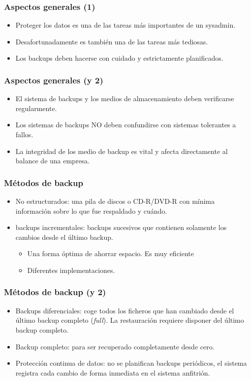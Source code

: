 \documentclass{beamer}
\begin{document}
\begin{frame}
  \frametitle{Aspectos generales (1)}
  \begin{itemize}
    \item Proteger los datos es una de las tareas más importantes de un sysadmin.
    \item Desafortunadamente es también una de las tareas más tediosas.

    \item Los backups deben hacerse con cuidado y estrictamente planificados.
  \end{itemize}
\end{frame}

\begin{frame}
  \frametitle{Aspectos generales (y 2)}
  \begin{itemize}
    \item El sistema de backups y los medios de almacenamiento deben verificarse regularmente.
    \item Los sistemas de backups NO deben confundirse con sistemas tolerantes a fallos.
    \item La integridad de los medio de backup es vital y afecta directamente al balance de una empresa. 
  \end{itemize}
\end{frame}


\begin{frame}
  \frametitle{Métodos de backup}
  \begin{itemize}
    \item \alert{No estructurados:} una pila de discos o CD-R/DVD-R con mínima información sobre lo que fue respaldado y cuándo. 
    \item \alert{backups incrementales:} backups sucesivos que contienen solamente los cambios desde el último backup.
	  \begin{itemize}
		\item Una forma óptima de ahorrar espacio. Es muy eficiente
		\item Diferentes implementaciones.
	  \end{itemize}
  \end{itemize}
\end{frame}

\begin{frame}
  \frametitle{Métodos de backup (y 2)}
  \begin{itemize}
    \item \alert{Backups diferenciales:} coge todos los ficheros que han cambiado desde el último backup completo (\textit{full}). La restauración requiere disponer del último backup completo.
    \item \alert{Backup completo:} para ser recuperado completamente desde cero. 
    \item \alert{Protección continua de datos:} no se planifican backups periódicos, el sistema registra cada cambio de forma inmediata en el sistema anfitrión.
  \end{itemize}
\end{frame}
\end{document}
